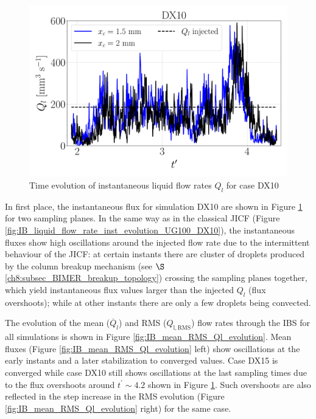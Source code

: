 \begin{figure}[ht]
	\centering
   \includegraphics[scale=0.222]{./part3_applications/figures_ch8_resolved/flow_rates_ibs/inst_Q_iso_x_DX10}
   \vspace*{-0.20in}
\caption{Time evolution of instantaneous liquid flow rates $Q_l$ for case DX10}
\label{fig:IB_liquid_flow_rate_inst_evolution_BIMER}
\end{figure}

\clearpage

In first place, the instantaneous flux for simulation DX10 are shown in Figure \ref{fig:IB_liquid_flow_rate_inst_evolution_BIMER} for two sampling planes. In the same way as in the classical JICF (Figure \ref{fig:IB_liquid_flow_rate_inst_evolution_UG100_DX10}), the instantaneous fluxes show high oscillations around the injected flow rate due to the intermittent behaviour of the JICF: at certain instants there are cluster of droplets produced by the column breakup mechanism (see $\S$\ref{ch8:subsec_BIMER_breakup_topology}) crossing the sampling planes together, which yield instantaneous flux values larger than the injected $Q_l$ (flux overshoots); while at other instants there are only a few droplets being convected.


The evolution of the mean ($\overline{Q}_l$) and RMS ($Q_\mathrm{l,\mathrm{RMS}}$) flow rates through the IBS for all simulations is shown in Figure \ref{fig:IB_mean_RMS_Ql_evolution}. Mean fluxes (Figure \ref{fig:IB_mean_RMS_Ql_evolution} left) show oscillations at the early instants and a later stabilization to converged values. Case DX15 is converged while case DX10 still shows oscillations at the last sampling times due to the flux overshoots around $t^\prime \sim 4.2$ shown in Figure \ref{fig:IB_liquid_flow_rate_inst_evolution_BIMER}. Such overshoots are also reflected in the step increase in the RMS evolution (Figure \ref{fig:IB_mean_RMS_Ql_evolution} right) for the same case. %

